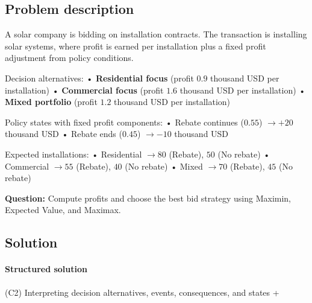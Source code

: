 \documentclass[11pt]{article}
\begin{document}
	
	\subsection*{Problem description}
	
	\hypertarget{problem9-problem}{}
	
	A solar company is bidding on installation contracts. The transaction is installing solar systems, where profit is earned
	per installation plus a fixed profit adjustment from policy conditions.
	
	
	
	
	
	
	Decision alternatives:
	• \textbf{Residential focus} (profit $0.9$ thousand USD per installation)
	• \textbf{Commercial focus} (profit $1.6$ thousand USD per installation)
	• \textbf{Mixed portfolio} (profit $1.2$ thousand USD per installation)
	
	
	
	
	
	
	Policy states with fixed profit components:
	• Rebate continues ($0.55$) $\to +20$ thousand USD
	• Rebate ends ($0.45$) $\to -10$ thousand USD
	
	
	
	
	
	
	Expected installations:
	• Residential $\to 80$ (Rebate), $50$ (No rebate)
	• Commercial $\to 55$ (Rebate), $40$ (No rebate)
	• Mixed $\to 70$ (Rebate), $45$ (No rebate)
	
	
	
	
	
	\textbf{Question:} Compute profits and choose the best bid strategy using Maximin, Expected Value, and Maximax.
	
	\subsection*{Solution}
	
	\hypertarget{problem9-solution}{}
	
	\paragraph{Structured solution}
	
	
	(C2) Interpreting decision alternatives, events, consequences, and states
	+
	
\end{document}

